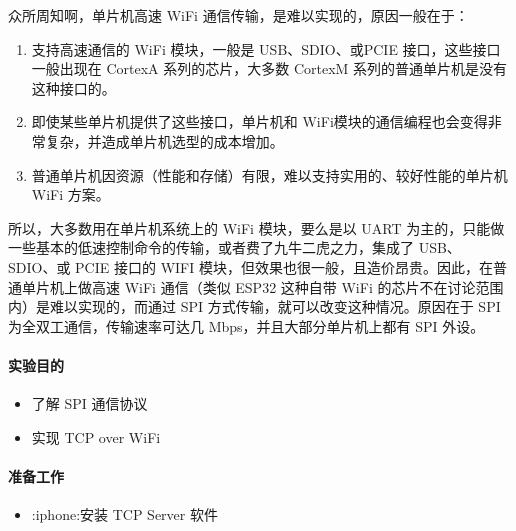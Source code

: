 \documentclass[a4paper,12pt,english]{sphinxmanual}
\begin{document}
\sphinxAtStartPar
众所周知啊，单片机高速 WiFi 通信传输，是难以实现的，原因一般在于：
\begin{enumerate}
%
\item {} 
\sphinxAtStartPar
支持高速通信的 WiFi 模块，一般是 USB、SDIO、或PCIE 接口，这些接口一般出现在 Cortex\sphinxhyphen{}A 系列的芯片，大多数 Cortex\sphinxhyphen{}M 系列的普通单片机是没有这种接口的。

\item {} 
\sphinxAtStartPar
即使某些单片机提供了这些接口，单片机和 WiFi模块的通信编程也会变得非常复杂，并造成单片机选型的成本增加。

\item {} 
\sphinxAtStartPar
普通单片机因资源（性能和存储）有限，难以支持实用的、较好性能的单片机 WiFi 方案。

\end{enumerate}

\sphinxAtStartPar
所以，大多数用在单片机系统上的 WiFi 模块，要么是以 UART 为主的，只能做一些基本的低速控制命令的传输，或者费了九牛二虎之力，集成了 USB、 SDIO、或 PCIE 接口的 WIFI 模块，但效果也很一般，且造价昂贵。因此，在普通单片机上做高速 WiFi  通信（类似 ESP32 这种自带 WiFi 的芯片不在讨论范围内）是难以实现的，而通过 SPI 方式传输，就可以改变这种情况。原因在于 SPI 为全双工通信，传输速率可达几 Mbps，并且大部分单片机上都有 SPI 外设。


\paragraph{实验目的}
\label{\detokenize{exp-stm32/wifi/tcp-over-wifi:id1}}\begin{itemize}
\item {} 
\sphinxAtStartPar
了解 SPI 通信协议

\item {} 
\sphinxAtStartPar
实现 TCP over WiFi

\end{itemize}


\paragraph{准备工作}
\label{\detokenize{exp-stm32/wifi/tcp-over-wifi:id2}}\begin{itemize}
\item {} 
\sphinxAtStartPar
:iphone:安装 TCP Server 软件

\end{itemize}
\end{document}
